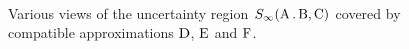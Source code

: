 \begin{figure}[ht]
  \centering
  \\
  \caption{Various views of the uncertainty region $S_\infty(\operatorname{A}.\operatorname{B},\operatorname{C})$ covered by compatible approximations $\operatorname{D}$, $\operatorname{E}$ and $\operatorname{F}$.}
\end{figure}

